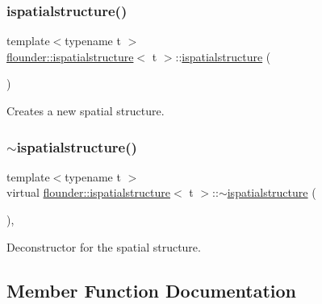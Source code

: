\subsubsection{\texorpdfstring{ispatialstructure()}{ispatialstructure()}}
{\footnotesize\ttfamily template$<$typename t $>$ \\
\hyperlink{classflounder_1_1ispatialstructure}{flounder\+::ispatialstructure}$<$ t $>$\+::\hyperlink{classflounder_1_1ispatialstructure}{ispatialstructure} (\begin{DoxyParamCaption}{ }\end{DoxyParamCaption})\hspace{0.3cm}{\ttfamily [inline]}}



Creates a new spatial structure. 

\mbox{\label{classflounder_1_1ispatialstructure_a355b10082dc172d15e1adbadba6c7f2b}} 
\subsubsection{\texorpdfstring{$\sim$ispatialstructure()}{~ispatialstructure()}}
{\footnotesize\ttfamily template$<$typename t $>$ \\
virtual \hyperlink{classflounder_1_1ispatialstructure}{flounder\+::ispatialstructure}$<$ t $>$\+::$\sim$\hyperlink{classflounder_1_1ispatialstructure}{ispatialstructure} (\begin{DoxyParamCaption}{ }\end{DoxyParamCaption})\hspace{0.3cm}{\ttfamily [inline]}, {\ttfamily [virtual]}}



Deconstructor for the spatial structure. 



\subsection{Member Function Documentation}
\mbox{\label{classflounder_1_1ispatialstructure_aaab8169c14104918fa96cca1a6d6700f}} 

